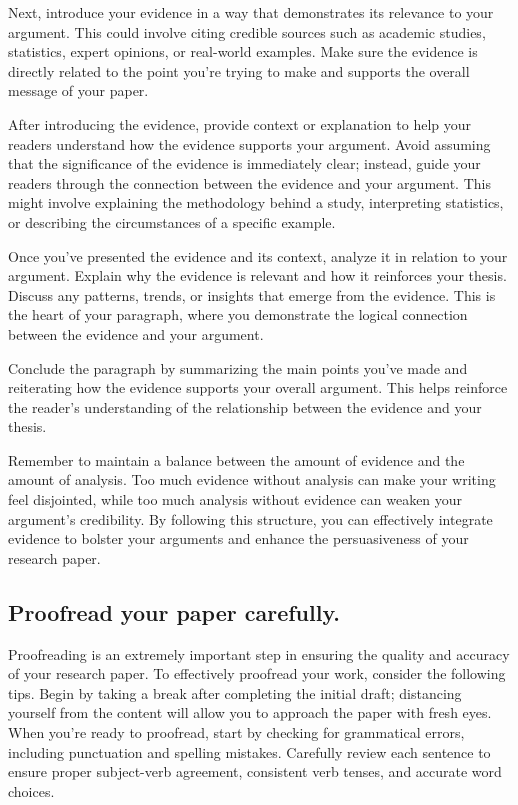 \documentclass[
  b5paper]{book}
\begin{document}
Next, introduce your evidence in a way that demonstrates its relevance to your argument. This could involve citing credible sources such as academic studies, statistics, expert opinions, or real-world examples. Make sure the evidence is directly related to the point you're trying to make and supports the overall message of your paper.

After introducing the evidence, provide context or explanation to help your readers understand how the evidence supports your argument. Avoid assuming that the significance of the evidence is immediately clear; instead, guide your readers through the connection between the evidence and your argument. This might involve explaining the methodology behind a study, interpreting statistics, or describing the circumstances of a specific example.

Once you've presented the evidence and its context, analyze it in relation to your argument. Explain why the evidence is relevant and how it reinforces your thesis. Discuss any patterns, trends, or insights that emerge from the evidence. This is the heart of your paragraph, where you demonstrate the logical connection between the evidence and your argument.

Conclude the paragraph by summarizing the main points you've made and reiterating how the evidence supports your overall argument. This helps reinforce the reader's understanding of the relationship between the evidence and your thesis.

Remember to maintain a balance between the amount of evidence and the amount of analysis. Too much evidence without analysis can make your writing feel disjointed, while too much analysis without evidence can weaken your argument's credibility. By following this structure, you can effectively integrate evidence to bolster your arguments and enhance the persuasiveness of your research paper.

\hypertarget{proofread-your-paper-carefully.}{%
\subsection*{Proofread your paper carefully.}\label{proofread-your-paper-carefully.}}

Proofreading is an extremely important step in ensuring the quality and accuracy of your research paper. To effectively proofread your work, consider the following tips. Begin by taking a break after completing the initial draft; distancing yourself from the content will allow you to approach the paper with fresh eyes. When you're ready to proofread, start by checking for grammatical errors, including punctuation and spelling mistakes. Carefully review each sentence to ensure proper subject-verb agreement, consistent verb tenses, and accurate word choices.
\end{document}
